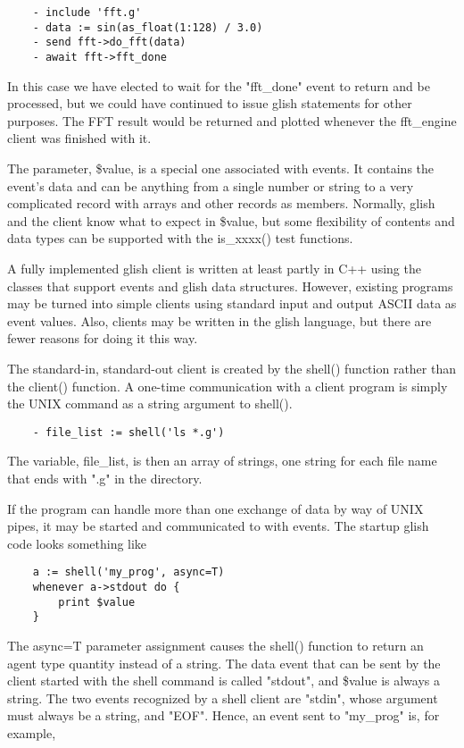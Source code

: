 \begin{verbatim}
	- include 'fft.g'
	- data := sin(as_float(1:128) / 3.0)
	- send fft->do_fft(data)
	- await fft->fft_done
\end{verbatim}

    In this case we have elected to wait for the "fft\_done" event to return
and be processed, but we could have continued to issue glish statements for
other purposes.  The FFT result would be returned and plotted whenever the
fft\_engine client was finished with it.

    The parameter, \$value, is a special one associated with events.  It
contains the event's data and can be anything from a single number or
string to a very complicated record with arrays and other records as
members.  Normally, glish and the client know what to expect in \$value, but
some flexibility of contents and data types can be supported with the
is\_xxxx() test functions.

    A fully implemented glish client is written at least partly in C++
using the classes that support events and glish data structures.  However,
existing programs may be turned into simple clients using standard input
and output ASCII data as event values.  Also, clients may be written in the
glish language, but there are fewer reasons for doing it this way.

    The standard-in, standard-out client is created by the shell() function
rather than the client() function.  A one-time communication with a client
program is simply the UNIX command as a string argument to shell().

\begin{verbatim}
	- file_list := shell('ls *.g')
\end{verbatim}

The variable, file\_list, is then an array of strings, one string for each
file name that ends with ".g" in the directory.

    If the program can handle more than one exchange of data by way of UNIX
pipes, it may be started and communicated to with events.  The startup
glish code looks something like

\begin{verbatim}
	a := shell('my_prog', async=T)
	whenever a->stdout do {
	    print $value
	}
\end{verbatim}

The async=T parameter assignment causes the shell() function to return an
agent type quantity instead of a string.  The data event that can be sent
by the client started with the shell command is called "stdout", and \$value
is always a string.  The two events recognized by a shell client are
"stdin", whose argument must always be a string, and "EOF".  Hence, an
event sent to "my\_prog" is, for example,

